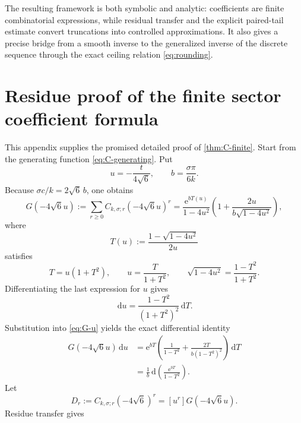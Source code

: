 \documentclass[11pt,a4paper]{article}
\numberwithin{equation}{section}
\theoremstyle{definition}
\theoremstyle{remark}
\newcommand{\e}{\mathrm e}
\newcommand{\dd}{\,\mathrm d}
\begin{document}
The resulting framework is both symbolic and analytic: coefficients are
finite combinatorial expressions, while residual transfer and the explicit
paired-tail estimate convert truncations into controlled approximations.  It
also gives a precise bridge from a smooth inverse to the generalized inverse of
the discrete sequence through the exact ceiling relation
\eqref{eq:rounding}.

\appendix

\section{Residue proof of the finite sector coefficient formula}
\label{app:finite-sum-proof}

This appendix supplies the promised detailed proof of
\cref{thm:C-finite}.  Start from the generating function
\eqref{eq:C-generating}.  Put
\begin{equation}\label{eq:appendix-u-b}
 u=-\frac{t}{4\sqrt6},\qquad b=\frac{\sigma\pi}{6k}.
\end{equation}
Because $\sigma c/k=2\sqrt6\,b$, one obtains
\begin{equation}\label{eq:G-u}
 G(-4\sqrt6u):=\sum_{r\geq0}C_{k,\sigma;r}(-4\sqrt6u)^r
 =\frac{\e^{bT(u)}}{1-4u^2}
 \left(1+\frac{2u}{b\sqrt{1-4u^2}}\right),
\end{equation}
where
\begin{equation}\label{eq:T-catalan}
 T(u):=\frac{1-\sqrt{1-4u^2}}{2u}
\end{equation}
satisfies
\begin{equation}\label{eq:T-functional}
 T=u(1+T^2),\qquad
 u=\frac{T}{1+T^2},\qquad
 \sqrt{1-4u^2}=\frac{1-T^2}{1+T^2}.
\end{equation}
Differentiating the last expression for $u$ gives
\begin{equation}\label{eq:du-dT}
 \dd u=\frac{1-T^2}{(1+T^2)^2}\dd T.
\end{equation}
Substitution into \eqref{eq:G-u} yields the exact differential identity
\begin{align}
 G(-4\sqrt6u)\dd u
 &=\e^{bT}
 \left(\frac1{1-T^2}+\frac{2T}{b(1-T^2)^2}\right)\dd T
 \nonumber\\
 &=\frac1b\dd\left(\frac{\e^{bT}}{1-T^2}\right).
 \label{eq:G-differential}
\end{align}
Let
\begin{equation}\label{eq:Dr}
 D_r:=C_{k,\sigma;r}(-4\sqrt6)^r=[u^r]G(-4\sqrt6u).
\end{equation}
Residue transfer gives
\end{document}
